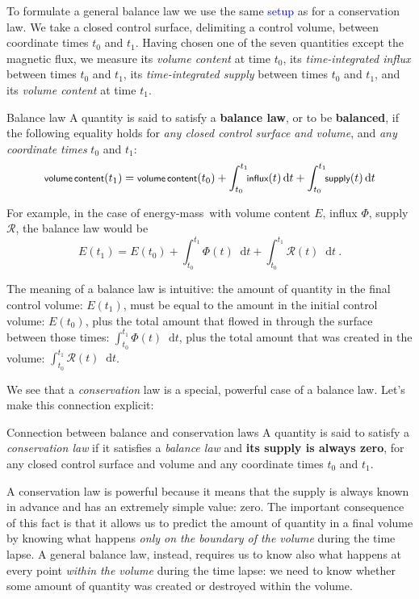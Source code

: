\documentclass[a4paper,12pt,%
onecolumn,oneside,%
british%
]{memoir}
\newcommand*{\di}{\mathop{}\!\mathrm{d}}%
\renewcommand*{\|}[1][]{\nonscript\:#1\vert\nonscript\:\mathopen{}}
\newcommand*{\sect}{\S}%
\renewcommand*{\autoref}[3][\sect\,\ref]{\textcolor{blue}{#3}
\raisebox{0.6ex}{\color{blue}\miniscule%
\faIcon{angle-right}%
\;#1{#2}\;p.\,\pageref{#2}}}
\newcommand*{\energym}{energy-mass}
\newcommand*{\yti}{t_{0}}
\newcommand*{\ytf}{t_{1}}
\newcommand*{\dt}{\di t}
\newcommand*{\yE}{E}
\newcommand*{\yH}{\varPhi}%
\newcommand*{\yR}{\mathcal{R}}%
\begin{document}
To formulate a general balance law we use the same \autoref{sec:balance_setup}{setup} as for a conservation law. We take a closed control surface, delimiting a control volume, between coordinate times $\yti$ and $\ytf$. Having chosen one of the seven quantities except the magnetic flux, we measure its \emph{volume content} at time $\yti$, its \emph{time-integrated influx} between times $\yti$ and $\ytf$, 
its  \emph{time-integrated supply}  between times $\yti$ and $\ytf$,
and its \emph{volume content} at time $\ytf$.

\begin{definition}{Balance law}
  A quantity is said to satisfy a \textbf{balance law}, or to be \textbf{balanced}, if the following equality holds for \emph{any closed control surface and volume}, and \emph{any coordinate times} $\yti$ and $\ytf$:
  \begin{equation}
    \label{eq:balanced}
    \textsf{\footnotesize volume\,content}(\ytf) =
    \textsf{\footnotesize volume\,content}(\yti) +
    \int_{\yti}^{\ytf}\!\!\textsf{\footnotesize influx}(t)\dt +
    \int_{\yti}^{\ytf}\!\!\textsf{\footnotesize supply}(t)\dt
  \end{equation}
\end{definition}
For example, in the case of \energym\ with volume content $\yE$, influx $\yH$, supply $\yR$, the balance law would be
\begin{equation*}
  \yE(\ytf) = \yE(\yti)
  + \int_{\yti}^{\ytf}\!\!\yH(t)\dt
  + \int_{\yti}^{\ytf}\!\!\yR(t)\dt \ .
\end{equation*}

The meaning of a balance law is intuitive: the amount of quantity in the final control volume: $\yE(\ytf)$, must be equal to the amount in the initial control volume: $\yE(\yti)$, plus the total amount that flowed in through the surface between those times:  $\int_{\yti}^{\ytf}\!\!\yH(t)\dt$, plus the total amount that was created in the volume: $\int_{\yti}^{\ytf}\!\!\yR(t)\dt$.

\medskip

We see that a \emph{conservation} law is a special, powerful case of a balance law. Let's make this connection explicit:
\begin{definition}{Connection between balance and conservation laws}
  A quantity is said to satisfy a \emph{conservation law} if it satisfies a \emph{balance law} and \textbf{its supply is always zero}, for any closed control surface and volume and any coordinate times $\yti$ and $\ytf$.
\end{definition}
A conservation law is powerful because it means that the supply is always known in advance and has an extremely simple value: zero. The important consequence of this fact is that it allows us to predict the amount of quantity in a final volume by knowing what happens \emph{only on the boundary of the volume} during the time lapse. A general balance law, instead, requires us to know also what happens at every point \emph{within the volume} during the time lapse: we need to know whether some amount of quantity was created or destroyed within the volume.
\end{document}
